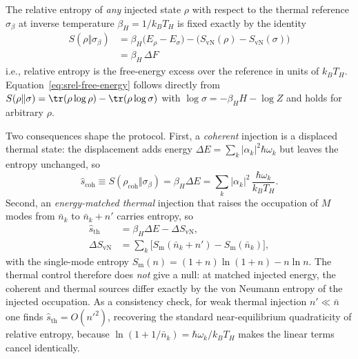 \documentclass[aps,prd,twocolumn,superscriptaddress,nofootinbib,floatfix]{revtex4-2}
\begin{document}
The relative entropy of \emph{any} injected state $\rho$ with respect to the thermal reference $\sigma_{\beta}$ at inverse temperature $\beta_H = 1/k_B T_H$ is fixed exactly by the identity
\begin{equation}
    \boxed{
    \begin{aligned}
    S(\rho\Vert\sigma_\beta)
    &= \beta_H\big(E_\rho - E_\sigma\big)
       - \big(S_{\mathrm{vN}}(\rho) - S_{\mathrm{vN}}(\sigma)\big) \\
    &= \beta_H\,\Delta F
    \end{aligned}}
    \label{eq:srel-free-energy}
\end{equation}
i.e., relative entropy is the free-energy excess over the reference in units of $k_B T_H$. Equation~\eqref{eq:srel-free-energy} follows directly from $S(\rho\Vert\sigma) = \tr(\rho\log\rho) - \tr(\rho\log\sigma)$ with $\log\sigma = -\beta_H H - \log Z$ and holds for arbitrary $\rho$.

Two consequences shape the protocol. First, a \emph{coherent} injection is a displaced thermal state: the displacement adds energy $\Delta E = \sum_k |\alpha_k|^2 \hbar\omega_k$ but leaves the entropy unchanged, so
\begin{equation}
    \hat{s}_{\mathrm{coh}} \equiv S(\rho_{\mathrm{coh}}\Vert\sigma_\beta)
    = \beta_H \Delta E
    = \sum_k |\alpha_k|^2\,\frac{\hbar\omega_k}{k_B T_H}.
    \label{eq:s-coherent}
\end{equation}
Second, an \emph{energy-matched thermal} injection that raises the occupation of $M$ modes from $\bar{n}_k$ to $\bar{n}_k + n'$ carries entropy, so
\begin{equation}
    \begin{aligned}
    \hat{s}_{\mathrm{th}}
    &= \beta_H \Delta E - \Delta S_{\mathrm{vN}}, \\
    \Delta S_{\mathrm{vN}}
    &= \sum_{k}\big[
        S_{\mathrm{m}}(\bar{n}_k + n') - S_{\mathrm{m}}(\bar{n}_k)
       \big],
    \end{aligned}
    \label{eq:s-thermal}
\end{equation}
with the single-mode entropy $S_{\mathrm{m}}(n) = (1+n)\ln(1+n) - n\ln n$. The thermal control therefore does \emph{not} give a null: at matched injected energy, the coherent and thermal sources differ exactly by the von Neumann entropy of the injected occupation. As a consistency check, for weak thermal injection $n' \ll \bar{n}$ one finds $\hat{s}_{\mathrm{th}} = O(n'^2)$, recovering the standard near-equilibrium quadraticity of relative entropy, because $\ln(1+1/\bar{n}_k) = \hbar\omega_k/k_BT_H$ makes the linear terms cancel identically.
\end{document}
